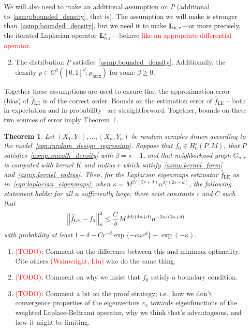 \documentclass{article}
\newcommand{\1}{\mathbf{1}}
\newcommand{\Lap}{{\bf L}}
\newcommand{\wh}[1]{\widehat{#1}}
\newcommand{\LE}{\mathrm{LE}}
\theoremstyle{alden}
\theoremstyle{aldenthm}
\newtheorem{theorem}{Theorem}
\theoremstyle{definition}
\theoremstyle{remark}
\begin{document}
We will also need to make an additional assumption on $P$ (additional to~\ref{asmp:bounded_density}, that is). The assumption we will make is stronger than~\ref{asmp:bounded_density}, but we need it to make $\Lap_{{n,r}}$---or more precisely, the iterated Laplacian operator $\Lap_{{n,r}}^s$---behave \textcolor{red}{like an appropriate differential operator}.
\begin{enumerate}[label=(P\arabic*)]
	\setcounter{enumi}{1}
	\item 
	\label{asmp:smooth_density}The distribution $P$ satisfies~\ref{asmp:bounded_density}. Additionally, the density $p \in C^{\beta}([0,1]^d;p_{\max})$ for some $\beta \geq 0$. 
\end{enumerate}
Together these assumptions are used to ensure that the approximation error (bias) of $\wh{f}_{\LE}$ is of the correct order. Bounds on the estimation error of $\wh{f}_{\LE}$ -- both in expectation and in probability-- are straightforward. Together, bounds on these two sources of error imply Theorem~\ref{thm:laplacian_eigenmaps_estimation}.
\begin{theorem}
	\label{thm:laplacian_eigenmaps_estimation}
	Let $(X_1,Y_1),\ldots,(X_n,Y_n)$ be random samples drawn according to the model~\eqref{eqn:random_design_regression}. Suppose that $f_0 \in H_0^s(P,M)$, that $P$ satisfies~\ref{asmp:smooth_density} with $\beta = s - 1$, and that neighborhood graph $G_{n,r}$ is computed with kernel $K$ and radius $r$ which satisfy~\ref{asmp:kernel_form} and~\ref{asmp:kernel_radius}. Then, for the Laplacian eigenmaps estimator $\wh{f}_{\LE}$ as in~\eqref{eqn:laplacian_eigenmaps}, when $\kappa = M^{2/(2s + d)}n^{d/(2s + d)}$, the following statement holds: for all $n$ sufficiently large, there exist constants $c$ and $C$ such that
	\begin{equation*}
	\Bigl\|\wh{f}_{\LE} - f_0\Bigr\|_n^2 \leq \frac{C}{\delta} M^{2d/(4s + d)} n^{-2s/(2s + d)}
	\end{equation*}
	with probability at least $1 - \delta -  Cr^{-d}\exp\{-cnr^d\} - \exp(-\kappa)$.
\end{theorem}

\begin{enumerate}
	\item \textcolor{red}{(TODO)}: Comment on the difference between this and minimax optimality. Cite others \textcolor{red}{(Wainwright, Liu)} who do the same thing.
	\item \textcolor{red}{(TODO)}: Comment on why we insist that $f_0$ satisfy a boundary condition.
	\item \textcolor{red}{(TODO)}: Comment a bit on the proof strategy; i.e., how we don't convergence properties of the eigenvectors $v_k$ towards eigenfunctions of the weighted Laplace-Beltrami operator, why we think that's advantageous, and how it might be limiting.
\end{enumerate}
\end{document}
